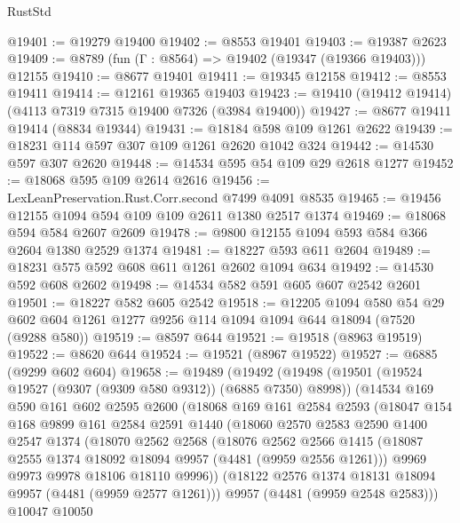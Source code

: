 \begin{lexlean}{RustStd}
\begin{coremodule}
@19401 := @19279 @19400
@19402 := @8553 @19401
@19403 := @19387 @2623
@19409 := @8789 (fun (Γ : @8564) => @19402 (@19347 (@19366 @19403))) @12155
@19410 := @8677 @19401
@19411 := @19345 @12158
@19412 := @8553 @19411
@19414 := @12161 @19365 @19403
@19423 := @19410 (@19412 @19414) (@4113 @7319 @7315 @19400 @7326 (@3984 @19400))
@19427 := @8677 @19411 @19414 (@8834 @19344)
@19431 := @18184 @598 @109 @1261 @2622
@19439 := @18231 @114 @597 @307 @109 @1261 @2620 @1042 @324
@19442 := @14530 @597 @307 @2620
@19448 := @14534 @595 @54 @109 @29 @2618 @1277
@19452 := @18068 @595 @109 @2614 @2616
@19456 := LexLeanPreservation.Rust.Corr.second @7499 @4091 @8535
@19465 := @19456 @12155 @1094 @594 @109 @109 @2611 @1380 @2517 @1374
@19469 := @18068 @594 @584 @2607 @2609
@19478 := @9800 @12155 @1094 @593 @584 @366 @2604 @1380 @2529 @1374
@19481 := @18227 @593 @611 @2604
@19489 := @18231 @575 @592 @608 @611 @1261 @2602 @1094 @634
@19492 := @14530 @592 @608 @2602
@19498 := @14534 @582 @591 @605 @607 @2542 @2601
@19501 := @18227 @582 @605 @2542
@19518 := @12205
    @1094
    @580
    @54
    @29
    @602
    @604
    @1261
    @1277
    @9256
    @114
    @1094
    @1094
    @644
    @18094
    (@7520 (@9288 @580))
@19519 := @8597 @644
@19521 := @19518 (@8963 @19519)
@19522 := @8620 @644
@19524 := @19521 (@8967 @19522)
@19527 := @6885 (@9299 @602 @604)
@19658 := @19489
    (@19492
      (@19498
        (@19501 (@19524 @19527 (@9307 (@9309 @580 @9312)) (@6885 @7350) @8998))
        (@14534
          @169
          @590
          @161
          @602
          @2595
          @2600
          (@18068
            @169
            @161
            @2584
            @2593
            (@18047
              @154
              @168
              @9899
              @161
              @2584
              @2591
              @1440
              (@18060
                @2570
                @2583
                @2590
                @1400
                @2547
                @1374
                (@18070
                  @2562
                  @2568
                  (@18076
                    @2562
                    @2566
                    @1415
                    (@18087 @2555 @1374 @18092 @18094 @9957 (@4481 (@9959 @2556 @1261)))
                    @9969
                    @9973
                    @9978
                    @18106
                    @18110
                    @9996))
                (@18122 @2576 @1374 @18131 @18094 @9957 (@4481 (@9959 @2577 @1261)))
                @9957
                (@4481 (@9959 @2548 @2583)))
              @10047
              @10050

\end{coremodule}
\end{lexlean}
